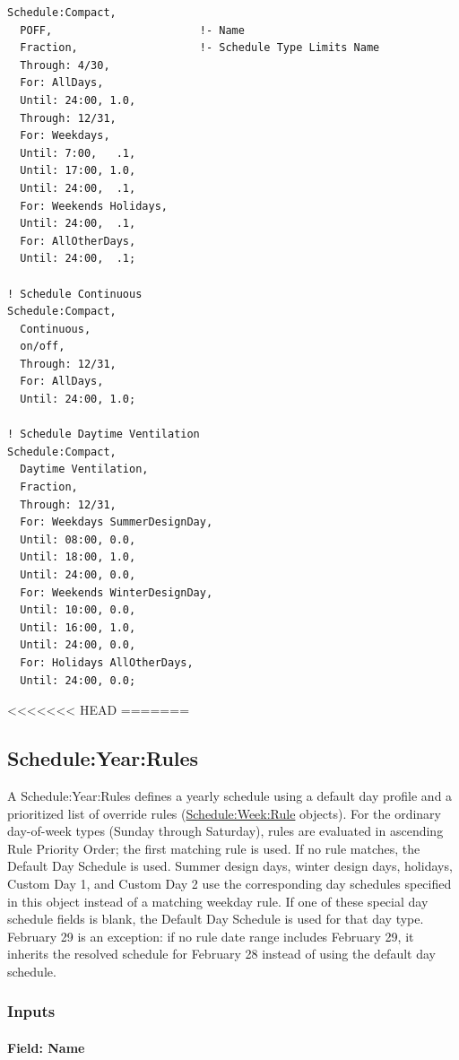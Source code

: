 \begin{lstlisting}
Schedule:Compact,
  POFF,                       !- Name
  Fraction,                   !- Schedule Type Limits Name
  Through: 4/30,
  For: AllDays,
  Until: 24:00, 1.0,
  Through: 12/31,
  For: Weekdays,
  Until: 7:00,   .1,
  Until: 17:00, 1.0,
  Until: 24:00,  .1,
  For: Weekends Holidays,
  Until: 24:00,  .1,
  For: AllOtherDays,
  Until: 24:00,  .1;

! Schedule Continuous
Schedule:Compact,
  Continuous,
  on/off,
  Through: 12/31,
  For: AllDays,
  Until: 24:00, 1.0;

! Schedule Daytime Ventilation
Schedule:Compact,
  Daytime Ventilation,
  Fraction,
  Through: 12/31,
  For: Weekdays SummerDesignDay,
  Until: 08:00, 0.0,
  Until: 18:00, 1.0,
  Until: 24:00, 0.0,
  For: Weekends WinterDesignDay,
  Until: 10:00, 0.0,
  Until: 16:00, 1.0,
  Until: 24:00, 0.0,
  For: Holidays AllOtherDays,
  Until: 24:00, 0.0;
\end{lstlisting}

<<<<<<< HEAD
=======
\subsection{Schedule:Year:Rules}\label{scheduleyearrules}

A Schedule:Year:Rules defines a yearly schedule using a default day profile and a prioritized list of override rules (\hyperref[scheduleweekrule]{Schedule:Week:Rule} objects).
For the ordinary day-of-week types (Sunday through Saturday), rules are evaluated in ascending Rule Priority Order; the first matching rule is used.
If no rule matches, the Default Day Schedule is used.
Summer design days, winter design days, holidays, Custom Day 1, and Custom Day 2 use the corresponding day schedules specified in this object instead of a matching weekday rule.
If one of these special day schedule fields is blank, the Default Day Schedule is used for that day type.
February 29 is an exception: if no rule date range includes February 29, it inherits the resolved schedule for February 28 instead of using the default day schedule.

\subsubsection{Inputs}\label{inputs-scheduleyearrules}

\paragraph{Field: Name}\label{field-name-scheduleyearrules}

